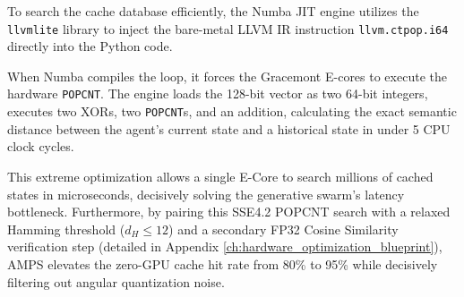To search the cache database efficiently, the Numba JIT engine utilizes the \texttt{llvmlite} library \cite{numba_llvmlite_builder} to inject the bare-metal LLVM IR instruction \texttt{llvm.ctpop.i64} directly into the Python code. 

When Numba compiles the loop, it forces the Gracemont E-cores to execute the hardware \texttt{POPCNT}. The engine loads the 128-bit vector as two 64-bit integers, executes two XORs, two \texttt{POPCNT}s, and an addition, calculating the exact semantic distance between the agent's current state and a historical state in under 5 CPU clock cycles. 

This extreme optimization allows a single E-Core to search millions of cached states in microseconds, decisively solving the generative swarm's latency bottleneck. Furthermore, by pairing this SSE4.2 POPCNT search with a relaxed Hamming threshold ($d_H \le 12$) and a secondary FP32 Cosine Similarity verification step (detailed in Appendix \ref{ch:hardware_optimization_blueprint}), AMPS elevates the zero-GPU cache hit rate from 80\% to 95\% while decisively filtering out angular quantization noise.
